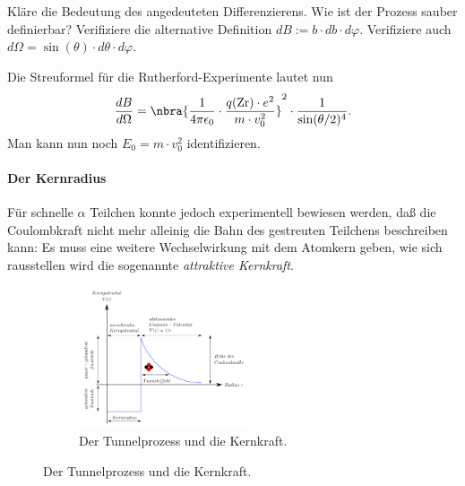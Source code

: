 \documentclass{subfiles}
\begin{document}
    \begin{Aufgabe}
        \nr{} Kläre die Bedeutung des angedeuteten Differenzierens. Wie ist der Prozess sauber definierbar?
        \nr{} Verifiziere die alternative Definition $dB:=b\cdot db\cdot d\varphi$. Verifiziere auch $d\Omega=\sin(\theta) \cdot d\theta\cdot d\varphi$. 
    \end{Aufgabe}

    Die Streuformel für die Rutherford-Experimente lautet nun
    \[\frac{dB}{d\Omega} = \nbra{\frac{1}{4\pi\epsilon_0}\cdot\frac{q(\text{Zr})\cdot e^2}{m\cdot v_0^2}}^2 \cdot \frac{1}{\sin(\theta/2)^4}.\]
    Man kann nun noch $E_0=m\cdot v_0^2$ identifizieren. 

    \paragraph*{Der Kernradius}
        Für schnelle $\alpha$ Teilchen konnte jedoch experimentell bewiesen werden, daß die Coulombkraft nicht mehr alleinig die Bahn des gestreuten Teilchens beschreiben kann: Es muss eine weitere Wechselwirkung mit dem Atomkern geben, wie sich rausstellen wird die sogenannte \emph{attraktive Kernkraft}.
        \begin{figure}[H]
            \centering
            \begin{subfigure}[b]{0.4\textwidth}
                \centering
                \includegraphics[width=5cm]{Bilddateien/1200px-Tunneleffekt_alpha_zerfall.svg.png}
                \caption{Der Tunnelprozess und die Kernkraft.}
            \end{subfigure}
        \end{figure}
\end{document}
